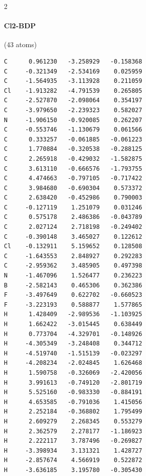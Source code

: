 \begin{multicols}{2}
\paragraph{Cl2-BDP} (43 atoms)
{\scriptsize\linespread{1}\selectfont\begin{verbatim}
C      0.961230   -3.258929   -0.158368
C     -0.321349   -2.534169    0.025959
C     -1.564935   -3.113928    0.211059
Cl    -1.913282   -4.791539    0.265805
C     -2.527870   -2.098064    0.354197
C     -3.979650   -2.239323    0.582027
N     -1.906150   -0.920085    0.262207
C     -0.553746   -1.130679    0.061566
C      0.333257   -0.061885   -0.061223
C      1.770884   -0.320538   -0.288125
C      2.265918   -0.429032   -1.582875
C      3.613110   -0.666576   -1.793755
C      4.474663   -0.797105   -0.717422
C      3.984680   -0.690304    0.573372
C      2.638420   -0.452986    0.790003
C     -0.127119    1.251079    0.031246
C      0.575178    2.486386   -0.043789
C      2.027124    2.718198   -0.249402
C     -0.390148    3.465027    0.122612
Cl    -0.132911    5.159652    0.128508
C     -1.643553    2.848927    0.292283
C     -2.959362    3.485905    0.497398
N     -1.467096    1.526477    0.236223
B     -2.582143    0.465306    0.362386
F     -3.497649    0.622702   -0.660523
F     -3.223193    0.588877    1.577865
H      1.428409   -2.989536   -1.103925
H      1.662422   -3.015445    0.638449
H      0.773704   -4.329701   -0.148926
H     -4.305349   -3.248408    0.344712
H     -4.519740   -1.515139   -0.023297
H     -4.208234   -2.024845    1.626468
H      1.590758   -0.326069   -2.420056
H      3.991613   -0.749120   -2.801719
H      5.525160   -0.983330   -0.884191
H      4.653585   -0.791036    1.415056
H      2.252184   -0.368802    1.795499
H      2.609279    2.268345    0.553279
H      2.362579    2.278177   -1.186923
H      2.222117    3.787496   -0.269827
H     -3.398934    3.131321    1.428727
H     -2.857674    4.566919    0.522872
H     -3.636185    3.195780   -0.305430
\end{verbatim}}

\end{multicols}
